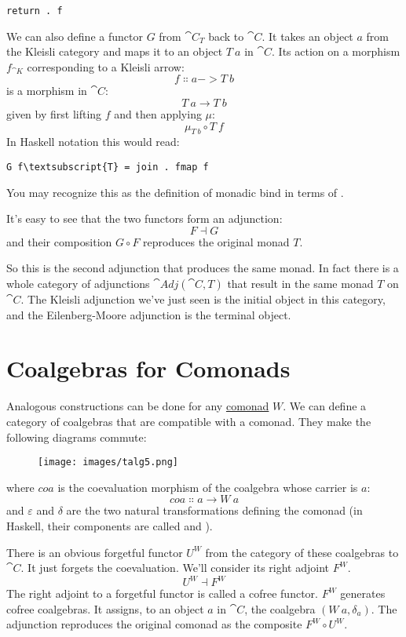 \begin{Verbatim}
return . f
\end{Verbatim}
We can also define a functor $G$ from $\cat{C}_T$
back to $\cat{C}$. It takes an object $a$ from the Kleisli
category and maps it to an object $T\ a$ in $\cat{C}$. Its action 
on a morphism $f_{\cat{K}}$ corresponding to a Kleisli arrow:
\[f \Colon a -> T\ b\]
is a morphism in $\cat{C}$:
\[T\ a \to T\ b\]
given by first lifting $f$ and then applying $\mu$:
\[\mu_{T\ b} \circ T\ f\]
In Haskell notation this would read:

\begin{Verbatim}[commandchars=\\\{\}]
G f\textsubscript{T} = join . fmap f
\end{Verbatim}
You may recognize this as the definition of monadic bind in terms of
.

It's easy to see that the two functors form an adjunction:
\[F \dashv G\]
and their composition $G \circ F$ reproduces the original monad $T$.

So this is the second adjunction that produces the same monad. In fact
there is a whole category of adjunctions $\cat{Adj}(\cat{C}, T)$ that result
in the same monad $T$ on $\cat{C}$. The Kleisli adjunction we've
just seen is the initial object in this category, and the
Eilenberg-Moore adjunction is the terminal object.

\section{Coalgebras for Comonads}

Analogous constructions can be done for any
\hyperref[comonads]{comonad}
$W$. We can define a category of coalgebras that are compatible
with a comonad. They make the following diagrams commute:

\begin{figure}[H]
\centering
\texttt{[image: images/talg5.png]}
\end{figure}

\noindent
where $coa$ is the coevaluation morphism of the coalgebra whose
carrier is $a$:
\[coa \Colon a \to W\ a\]
and $\varepsilon$ and $\delta$ are the two natural transformations
defining the comonad (in Haskell, their components are called
 and ).

There is an obvious forgetful functor $U^W$ from the category of
these coalgebras to $\cat{C}$. It just forgets the coevaluation. We'll
consider its right adjoint $F^W$.
\[U^W \dashv F^W\]
The right adjoint to a forgetful functor is called a cofree functor.
$F^W$ generates cofree coalgebras. It assigns, to an object
$a$ in $\cat{C}$, the coalgebra $(W\ a, \delta_a)$. The
adjunction reproduces the original comonad as the composite
$F^W \circ U^W$.


